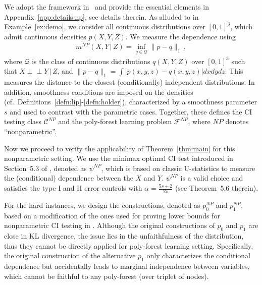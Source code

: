 \documentclass{article}
\theoremstyle{definition}
\theoremstyle{definition}
\theoremstyle{definition}
\theoremstyle{definition}
\theoremstyle{definition}
\theoremstyle{definition}
\theoremstyle{remark}
\theoremstyle{remark}
\newcommand{\given}{\,|\,}
\newcommand{\indep}{\perp \!\!\! \perp }
\newcommand{\dpdm}{m}
\newcommand{\ciclass}{\mathcal{C}}
\newcommand{\pfclass}{\mathcal{F}}
\begin{document}
We adopt the framework in~\citet{neykov2021minimax} and provide the essential elements in Appendix~\ref{app:details:np}, see details therein. 
As alluded to in Example~\ref{ex:demo}, we consider all continuous distributions over $[0,1]^3$, which admit continuous densities $p(X,Y,Z)$. We measure the dependence using
\begin{align*}
    \dpdm^{NP}(X,Y\given Z) = \inf_{q\in \mathcal{Q}} \|p - q\|_1 \,,
\end{align*}
where $\mathcal{Q}$ is the class of continuous distributions $q(X,Y,Z)$ over $[0,1]^3$ such that $X\indep Y\given Z$, and $\|p - q\|_1 = \int |p(x,y,z) - q(x,y,z)| dxdydz$. This measures the distance to the closest (conditionally) independent distributions.
In addition, smoothness conditions are imposed on the densities (cf.~Definitions~\ref{defn:lip}-\ref{defn:holder}), characterized by a smoothness parameter $s$ and used to contrast with the parametric cases.
Together, these defines the CI testing class $\ciclass^{NP}$ and the poly-forest learning problem $\pfclass^{NP}$, where $NP$ denotes ``nonparametric''.

Now we proceed to verify the applicability of Theorem~\ref{thm:main} for this nonparametric setting. We use the minimax optimal CI test introduced in Section~5.3 of \citet{neykov2021minimax}, denoted as $\psi^{NP}$, which is based on classic U-statistics to measure the (conditional) dependence between the $X$ and $Y$. $\psi^{NP}$ is a valid choice and satisfies the type I and II error controls with $\alpha=\frac{5s+2}{2s}$ (see Theorem~5.6 therein).

For the hard instances, we design the constructions, denoted as $p_0^{NP}$ and $p_1^{NP}$, based on a modification of the ones used for proving lower bounds for nonparametric CI testing in \citet{neykov2021minimax}. 
Although the original constructions of $p_0$ and $p_1$ are close in KL divergence, the issue lies in the unfaithfulness of the distribution, thus they cannot be directly applied for poly-forest learning setting.
Specifically, the original construction of the alternative $p_1$ only characterizes the conditional dependence but accidentally leads to marginal independence between variables, which cannot be faithful to any poly-forest (over triplet of nodes).
\end{document}
